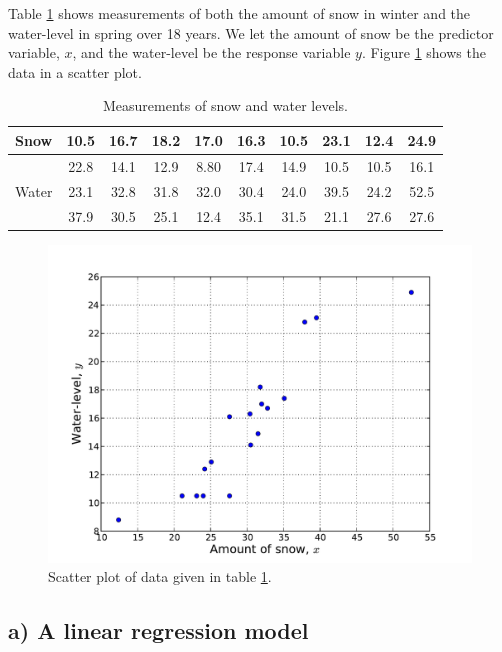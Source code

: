 \documentclass[a4paper, 11pt, titlepage]{article}
\begin{document}
Table \ref{table:snow} shows measurements of both the amount of snow in winter and the water-level in spring over 18 years. We let the amount of snow be the predictor variable, 
$x$, and the water-level be the response variable $y$. Figure \ref{fig:scatter} shows the data in a scatter plot.

\vspace{1cm}

\begin{table}[h]
\centering
\begin{tabular}{l | c | c | c | c | c | c | c | c | c }
Snow  & 10.5 & 16.7 & 18.2 & 17.0 & 16.3 & 10.5 & 23.1 & 12.4 & 24.9 \\ \hline
      & 22.8 & 14.1 & 12.9 & 8.80 & 17.4 & 14.9 & 10.5 & 10.5 & 16.1 \\ \hline
Water & 23.1 & 32.8 & 31.8 & 32.0 & 30.4 & 24.0 & 39.5 & 24.2 & 52.5 \\ \hline
      & 37.9 & 30.5 & 25.1 & 12.4 & 35.1 & 31.5 & 21.1 & 27.6 & 27.6 
\end{tabular}
\caption{Measurements of snow and water levels. \label{table:snow}}
\end{table}

\begin{figure}[htpb]
\centering
\includegraphics[width=\textwidth]{scatter.pdf}
\caption{Scatter plot of data given in table \ref{table:snow}. \label{fig:scatter}}
\end{figure}

\clearpage

\subsection*{a) A linear regression model}
\end{document}
